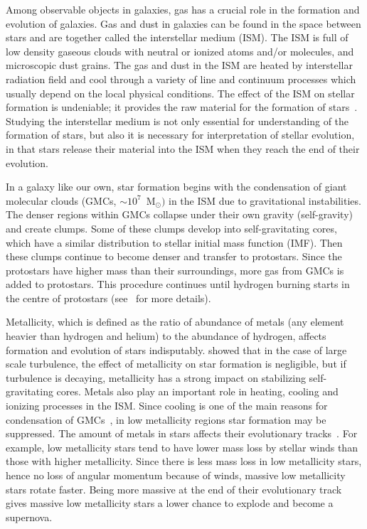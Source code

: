Among observable objects in galaxies, gas has a crucial role in the formation and evolution of galaxies.
Gas and dust in galaxies can be found in the space between stars and are together called the interstellar medium (ISM). The ISM is full of low density gaseous clouds with neutral or ionized atoms and/or molecules, and microscopic dust grains.
The gas and dust in the ISM are heated by interstellar radiation field and cool through a variety of line and continuum processes which usually depend on the local physical conditions. 
The effect of the ISM on stellar formation is undeniable;  it provides the raw material for the formation of stars~\citep[e.g.][]{Kennicutt08,Bigiel08}.
Studying the interstellar medium is not only essential for understanding of the formation of stars, but also it is necessary for interpretation of stellar evolution, in that stars release their material into the ISM when they reach the end of their evolution.


In a galaxy like our own, star formation begins with the condensation of giant molecular clouds (GMCs, $\sim 10^7$~M$_{\odot})$ in the ISM due to gravitational instabilities. 
The denser regions within GMCs collapse under their own gravity (self-gravity) and create clumps.
Some of these clumps develop into self-gravitating cores, which have a similar distribution to stellar initial mass function (IMF).
Then these clumps continue to become denser and transfer to protostars. 
Since the protostars have higher mass than their surroundings, more gas from GMCs is added to protostars.
This procedure continues until hydrogen burning starts in the centre of protostars (see~\cite{McKee07} for more details). 

Metallicity, which is defined as the ratio of abundance of metals (any element heavier than hydrogen and helium) to the abundance of hydrogen, affects formation and evolution of stars indisputably.
\cite{Walch11} showed that in the case of large scale turbulence, the effect of metallicity on star formation is negligible, but if turbulence is decaying,  metallicity has a strong impact on stabilizing self-gravitating cores.
Metals also play an important role in heating, cooling and ionizing processes in the ISM.
Since cooling is one of the main reasons for condensation of GMCs~\citep[e.g.][]{Maio07}, in low metallicity regions star formation may be suppressed. 
The amount of metals in stars affects their evolutionary tracks~\citep[e.g.][and references therein]{Maeder02}.
For example, low metallicity stars tend to have lower mass loss by stellar winds than those with higher metallicity.
Since there is less mass loss in low metallicity stars, hence no loss of angular momentum because of winds, massive low metallicity stars rotate faster.
Being more massive at the end of their evolutionary track gives massive low metallicity stars a lower chance to explode and become a supernova.


